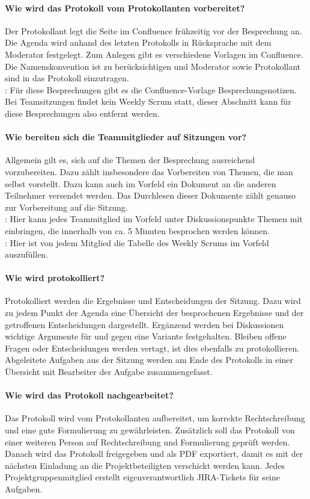 \paragraph{Wie wird das Protokoll vom Protokollanten vorbereitet?}
Der Protokollant legt die Seite im Confluence frühzeitig vor der Besprechung an. Die Agenda wird anhand des letzten Protokolls in Rücksprache mit dem Moderator festgelegt. Zum Anlegen gibt es verschiedene Vorlagen im Confluence. Die Namenskonvention ist zu berücksichtigen und Moderator sowie Protokollant sind in das Protokoll einzutragen. \\
:
Für diese Besprechungen gibt es die Confluence-Vorlage Besprechungsnotizen. Bei Teamsitzungen findet kein Weekly Scrum statt, dieser Abschnitt kann für diese Besprechungen also entfernt werden.

\paragraph{Wie bereiten sich die Teammitglieder auf Sitzungen vor?}
Allgemein gilt es, sich auf die Themen der Besprechung ausreichend vorzubereiten. Dazu zählt insbesondere das Vorbereiten von Themen, die man selbst vorstellt. Dazu kann auch im Vorfeld ein Dokument an die anderen Teilnehmer versendet werden. Das Durchlesen dieser Dokumente zählt genauso zur Vorbereitung auf die Sitzung.\\
:
Hier kann jedes Teammitglied im Vorfeld unter Diskussionspunkte Themen mit einbringen, die innerhalb von ca. 5 Minuten besprochen werden können.\\
:
Hier ist von jedem Mitglied die Tabelle des Weekly Scrums im Vorfeld auszufüllen.

\paragraph{Wie wird protokolliert?}
Protokolliert werden die Ergebnisse und Entscheidungen der Sitzung. Dazu wird zu jedem Punkt der Agenda eine Übersicht der besprochenen Ergebnisse und der getroffenen Entscheidungen dargestellt. Ergänzend werden bei Diskussionen wichtige Argumente für und gegen eine Variante festgehalten. Bleiben offene Fragen oder Entscheidungen werden vertagt, ist dies ebenfalls zu protokollieren. Abgeleitete Aufgaben aus der Sitzung werden am Ende des Protokolls in einer Übersicht mit Bearbeiter der Aufgabe zusammengefasst.

\paragraph{Wie wird das Protokoll nachgearbeitet?}
Das Protokoll wird vom Protokollanten aufbereitet, um korrekte Rechtschreibung und eine gute Formulierung zu gewährleisten. Zusätzlich soll das Protokoll von einer weiteren Person auf Rechtschreibung und Formulierung geprüft werden. Danach wird das Protokoll freigegeben und als PDF exportiert, damit es mit der nächsten Einladung an die Projektbeteiligten verschickt werden kann. Jedes Projektgruppenmitglied erstellt eigenverantwortlich JIRA-Tickets für seine Aufgaben.


